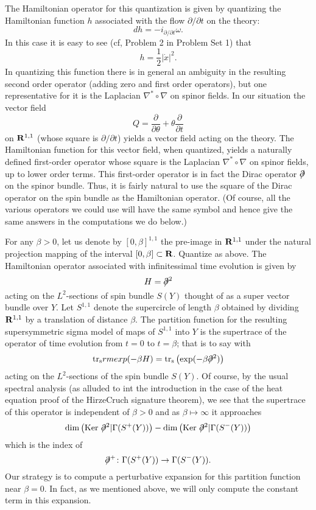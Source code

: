 The Hamiltonian operator for this quantization is given by quantizing
the Hamiltonian function $h$ 
associated with the flow $\partial/\partial t$ on the theory:
$$dh= -i_{\partial/\partial t}\omega.$$
In this case it is easy to see (cf, Problem 2 in Problem Set 1)
that 
$$h=\frac{1}{2} |\dot x|^2.$$
In quantizing this function
there is in general an ambiguity in the resulting second order
operator (adding zero and first order operators), but
one representative for it is the Laplacian $\nabla^*\circ\nabla$ on
spinor fields.
In our situation the vector field 
$$Q=\frac{\partial}{\partial \theta}+\theta\frac{\partial}{\partial
t}$$ on ${\bf R}^{1,1}$ (whose square is $\partial/\partial t$)
yields a vector field acting on the theory.
The Hamiltonian function for this vector field, when quantized,
yields a naturally defined first-order operator whose square is the
Laplacian $\nabla^*\circ\nabla$ on spinor fields, up to lower order
terms. 
This first-order operator is in fact the Dirac operator $\dirac$ on
the spinor bundle. 
Thus, it is fairly natural to use the square of the Dirac operator on
the spin bundle as the Hamiltonian operator.  (Of course, all the various
operators we could use will have the same symbol and hence give the
same answers in the computations we do below.)

For any $\beta>0$, let us denote by $[0,\beta]^{1,1}$ the pre-image in
${\bf R}^{1,1}$ under the natural projection mapping of the interval
$[0,\beta]\subset {\bf R}$. Quantize as above.
The Hamiltonian operator associated with infinitessimal
time evolution  is given by 
$$H= \dirac^2$$
acting on the $L^2$-sections of spin bundle  $S(Y)$ thought of as a
super vector bundle over $Y$.
Let  $S^{1,1}$ denote the supercircle of length $\beta$
obtained by dividing ${\bf R}^{1,1}$ by a translation of distance
$\beta$.
The partition function for the resulting supersymmetric sigma model of
maps of $S^{1,1}$ into $Y$
is  the supertrace of the operator of time evolution from $t=0$ to
$t=\beta$; that is to say with 
\begin{equation}\label{strform}
{\rm tr_s}rm exp(-\beta H)={\rm tr_s}\left({\rm exp}(-\beta
\dirac^2)\right) 
\end{equation}
acting on the $L^2$-sections of the spin bundle $S(Y)$.
Of course, by the usual spectral analysis (as  alluded to int the
introduction in the case of the heat equation proof of the HirzeCruch
signature theorem), we see that the supertrace
of this operator is independent of 
$\beta>0$ and as $\beta\mapsto \infty$ it
approaches 
$${\rm dim}\left({\rm Ker}\ \dirac^2|\Gamma(S^+(Y))\right)-{\rm
dim}\left({\rm Ker}\ \dirac^2|\Gamma(S^-(Y))\right)$$
which is the index of
$$\dirac^+\colon \Gamma(S^+(Y))\to \Gamma(S^-(Y)).$$
Our strategy is to compute a perturbative expansion for this partition
function near $\beta=0$.  In fact, as we mentioned above, we will only
compute the constant term in this expansion.


